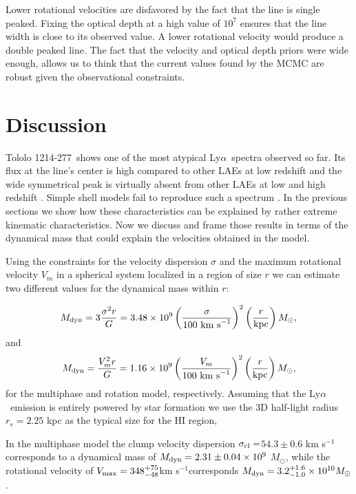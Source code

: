 \documentclass[a4,useAMS,usenatbib,usegraphicx]{mn2e}
\newcommand{\tol}{Tololo 1214-277}
\newcommand{\lya}{Ly$\alpha$}
\newcommand{\kms}{km s$^{-1}$}
\newcommand{\sigmaclump}{$54.3\pm 0.6$ km s$^{-1}$}
\begin{document}
Lower rotational velocities are disfavored by the fact that the line
is single peaked.
Fixing the optical depth at a high value of $10^7$ ensures that the line width
is close to its observed value.
A lower rotational velocity would produce a double peaked line.
The fact that the velocity and optical depth priors were wide enough,
allows us to think that the current values found by the MCMC are
robust given the observational constraints.




\section{Discussion}

\tol\ shows one of the most atypical \lya\ spectra observed so far.
Its flux at the line's center is high compared to other LAEs at low
redshift and the wide symmetrical peak is virtually absent from other
LAEs at low and high redshift \citep{LARS,Erb14,Trainor16}. Simple
shell models fail to reproduce such a spectrum
\cite{2015A&A...578A...7V}.  
In the previous sections we show how these characteristics can be
explained by rather extreme kinematic characteristics.
Now we discuss and frame those results in terms of the dynamical mass
that could explain the velocities obtained in the model.

Using the constraints for the velocity dispersion $\sigma$ and the
maximum rotational velocity $V_m$ in a spherical system localized in a
region of size $r$ we can estimate two different values for the
dynamical mass within $r$: 

\begin{equation}
M_{\rm dyn} = 3 \frac{\sigma ^{2}r}{G} = 3.48\times10^{9}
\left(\frac{\sigma}{100\ \mathrm{km\ s}^{-1}}\right)^2\left(\frac{r}{\mathrm{kpc}}\right)
M_{\odot}, 
\end{equation}
%
and
%
\begin{equation}
M_{\rm dyn} = \frac{V_m ^{2}r}{G} = 1.16\times10^{9}
\left(\frac{V_m}{100\ \mathrm{km\ s}^{-1}}\right)^2\left(\frac{r}{\mathrm{kpc}}\right)M_{\odot}, 
\end{equation}
%
for the multiphase and rotation model, respectively.
Assuming that the \lya\ emission is entirely powered by star formation 
we use the 3D half-light radius $r_s=2.25$ kpc as the typical size
for the HI region,


In the multiphase model the clump velocity dispersion
$\sigma_{\rm{cl}}=$\sigmaclump corresponds to a dynamical mass of
$M_{\rm dyn}=2.31\pm0.04 \times 10^{9}$ $M_{\odot}$, while the
rotational velocity of $V_{\rm max}=348^{+75}_{-48}$\kms corresponds
$M_{\rm dyn} = 3.2_{-1.0}^{+1.6}\times 10^{10} M_{\odot}$.
\end{document}
